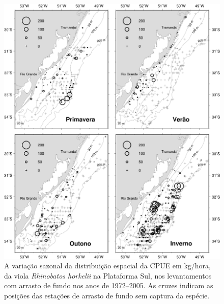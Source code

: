 \documentclass[a4paper,11pt,twoside,showtrims,onecolumn,openright,final]{memoir}
\begin{document}
\begin{figure}
\begin{center}
\includegraphics[width=\textwidth]{VIOLA_MAPA_DISTRIBUICAO_CPUE}
\end{center}
\caption[Variação sazonal da distribuição espacial da CPUE em kg/hora, da viola \emph{Rhinobatos horkelii}]
	{A variação sazonal da distribuição espacial da CPUE em kg/hora, da viola \emph{Rhinobatos horkelii} 
	 na Plataforma Sul, nos levantamentos com arrasto de fundo nos anos de 1972--2005. 
	 As cruzes indicam as posições das estações de arrasto de fundo sem captura da espécie.}
\label{fig:viola-mapacpue}
\end{figure}

\end{document}
